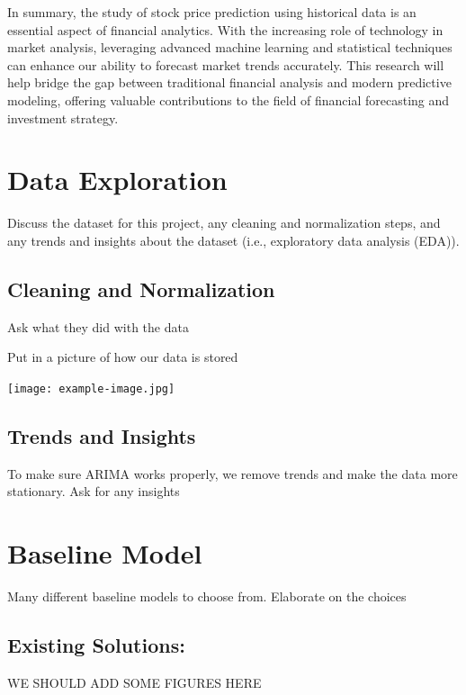 \documentclass[conference]{IEEEtran}
\begin{document}
In summary, the study of stock price prediction using historical data is an essential aspect of financial analytics. With the increasing role of technology in market analysis, leveraging advanced machine learning and statistical techniques can enhance our ability to forecast market trends accurately. This research will help bridge the gap between traditional financial analysis and modern predictive modeling, offering valuable contributions to the field of financial forecasting and investment strategy.


\section{Data Exploration}

 Discuss the dataset for this project, any cleaning and normalization steps, and any trends and insights about the dataset (i.e., exploratory data analysis (EDA)).

 \subsection{Cleaning and Normalization}
Ask what they did with the data

Put in a picture of how our data is stored

\texttt{[image: example-image.jpg]}


 \subsection{Trends and Insights}
 To make sure ARIMA works properly, we remove trends and make the data more stationary.
 Ask for any insights

\section{Baseline Model}

Many different baseline models to choose from.  Elaborate on the choices

\subsection{Existing Solutions: }

WE SHOULD ADD SOME FIGURES HERE
\end{document}
